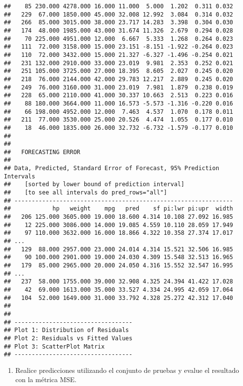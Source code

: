 \documentclass[]{article}
\providecommand{\tightlist}{%
  \setlength{\itemsep}{0pt}\setlength{\parskip}{0pt}}
\begin{document}
\begin{verbatim}
##    85 230.000 4278.000 16.000 11.000  5.000  1.202  0.311 0.032 
##   229  67.000 1850.000 45.000 32.008 12.992  3.084  0.314 0.032 
##   266  85.000 3015.000 38.000 23.717 14.283  3.398  0.304 0.030 
##   174  48.000 1985.000 43.000 31.674 11.326  2.679  0.294 0.028 
##    70 225.000 4951.000 12.000  6.667  5.333  1.268  0.264 0.023 
##   111  72.000 3158.000 15.000 23.151 -8.151 -1.922 -0.264 0.023 
##   110  72.000 3432.000 15.000 21.327 -6.327 -1.496 -0.254 0.021 
##   231 132.000 2910.000 33.000 23.019  9.981  2.353  0.252 0.021 
##   251 105.000 3725.000 27.000 18.395  8.605  2.027  0.245 0.020 
##   218  76.000 2144.000 42.000 29.783 12.217  2.889  0.245 0.020 
##   249  76.000 3160.000 31.000 23.019  7.981  1.879  0.238 0.019 
##   228  65.000 2110.000 41.000 30.337 10.663  2.513  0.223 0.016 
##    88 180.000 3664.000 11.000 16.573 -5.573 -1.316 -0.220 0.016 
##    66 198.000 4952.000 12.000  7.463  4.537  1.070  0.178 0.011 
##   211  77.000 3530.000 25.000 20.526  4.474  1.055  0.177 0.010 
##    18  46.000 1835.000 26.000 32.732 -6.732 -1.579 -0.177 0.010 
## 
## 
##   FORECASTING ERROR
## 
## Data, Predicted, Standard Error of Forecast, 95% Prediction Intervals 
##    [sorted by lower bound of prediction interval] 
##    [to see all intervals do pred_rows="all"] 
## --------------------------------------------------------------- 
##            hp   weight    mpg   pred    sf pi:lwr pi:upr  width 
##   206 125.000 3605.000 19.000 18.600 4.314 10.108 27.092 16.985 
##    12 225.000 3086.000 14.000 19.085 4.559 10.110 28.059 17.949 
##    97 110.000 3632.000 16.000 18.866 4.322 10.358 27.374 17.017 
## ... 
##   129  88.000 2957.000 23.000 24.014 4.314 15.521 32.506 16.985 
##    90 100.000 2901.000 19.000 24.030 4.309 15.548 32.513 16.965 
##   179  85.000 2965.000 20.000 24.050 4.316 15.552 32.547 16.995 
## ... 
##   237  58.000 1755.000 39.000 32.908 4.325 24.394 41.422 17.028 
##    42  69.000 1613.000 35.000 33.527 4.334 24.995 42.059 17.064 
##   104  52.000 1649.000 31.000 33.792 4.328 25.272 42.312 17.040 
## 
## 
## ---------------------------------- 
## Plot 1: Distribution of Residuals 
## Plot 2: Residuals vs Fitted Values 
## Plot 3: ScatterPlot Matrix 
## ----------------------------------
\end{verbatim}

\begin{enumerate}
\def\labelenumi{\arabic{enumi}.}
\setcounter{enumi}{4}
\tightlist
\item
  Realice predicciones utilizando el conjunto de pruebas y evalue el
  resultado con la métrica MSE.
\end{enumerate}
\end{document}
